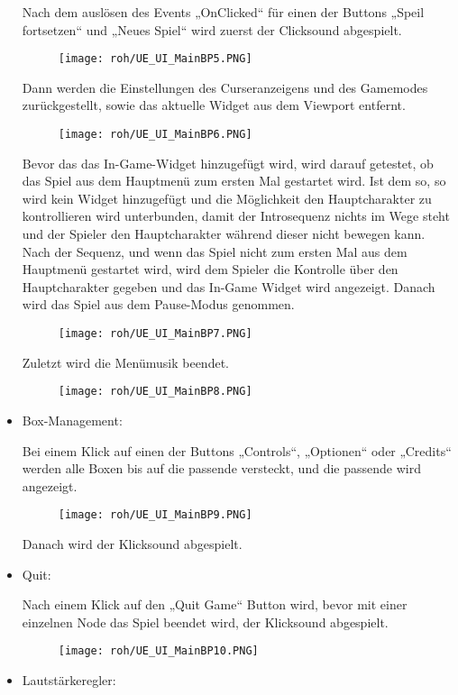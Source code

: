 \begin{itemize}
    Nach dem auslösen des Events „OnClicked“ für einen der Buttons „Speil fortsetzen“ und „Neues Spiel“ wird zuerst der Clicksound abgespielt.
    \begin{figure}[H]
        \centering
        \texttt{[image: roh/UE\_UI\_MainBP5.PNG]}
        \label{UE:UI_MainBP5}
    \end{figure}
    Dann werden die Einstellungen des Curseranzeigens und des Gamemodes zurückgestellt, sowie das aktuelle Widget aus dem Viewport entfernt.
    \begin{figure}[H]
        \centering
        \texttt{[image: roh/UE\_UI\_MainBP6.PNG]}
        \label{UE:UI_MainBP6}
    \end{figure}
    Bevor das das In-Game-Widget hinzugefügt wird, wird darauf getestet, ob das Spiel aus dem Hauptmenü zum ersten Mal gestartet wird. Ist dem so, so wird kein Widget hinzugefügt und die Möglichkeit den Hauptcharakter zu kontrollieren wird unterbunden, damit der Introsequenz nichts im Wege steht und der Spieler den Hauptcharakter während dieser nicht bewegen kann. Nach der Sequenz, und wenn das Spiel nicht zum ersten Mal aus dem Hauptmenü gestartet wird, wird dem Spieler die Kontrolle über den Hauptcharakter gegeben und das In-Game Widget wird angezeigt.
    Danach wird das Spiel aus dem Pause-Modus genommen.
    \begin{figure}[H]
        \centering
        \texttt{[image: roh/UE\_UI\_MainBP7.PNG]}
        \label{UE:UI_MainBP7}
    \end{figure}
    Zuletzt wird die Menümusik beendet.
    \begin{figure}[H]
        \centering
        \texttt{[image: roh/UE\_UI\_MainBP8.PNG]}
        \label{UE:UI_MainBP8}
    \end{figure}
    \item Box-Management:

    Bei einem Klick auf einen der Buttons „Controls“, „Optionen“ oder „Credits“ werden alle Boxen bis auf die passende versteckt, und die passende wird angezeigt.
    \begin{figure}[H]
        \centering
        \texttt{[image: roh/UE\_UI\_MainBP9.PNG]}
        \label{UE:UI_MainBP9}
    \end{figure}
    Danach wird der Klicksound abgespielt.
    \item Quit:

    Nach einem Klick auf den „Quit Game“ Button wird, bevor mit einer einzelnen Node das Spiel beendet wird, der Klicksound abgespielt.
    \begin{figure}[H]
        \centering
        \texttt{[image: roh/UE\_UI\_MainBP10.PNG]}
        \label{UE:UI_MainBP10}
    \end{figure}
    \item Lautstärkeregler:


\end{itemize}
